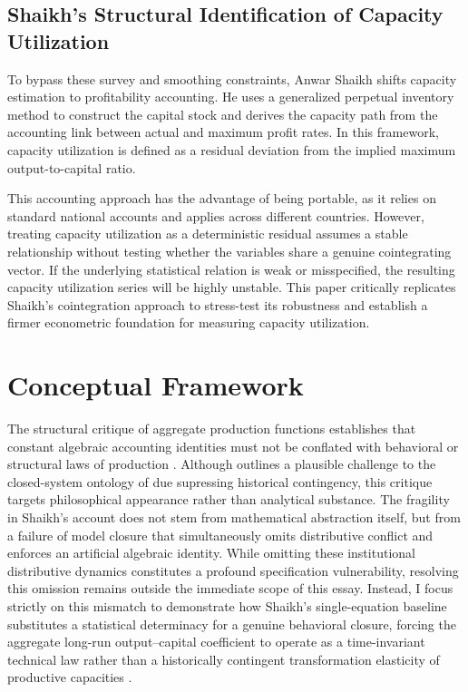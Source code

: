 \documentclass[11pt]{article}
\begin{document}
\subsection{Shaikh's Structural Identification of Capacity Utilization}
\label{subsec:shaikh_structural_measurement}

To bypass these survey and smoothing constraints, Anwar Shaikh \citep{Shaikh2016} shifts capacity estimation to profitability accounting. He uses a generalized perpetual inventory method to construct the capital stock and derives the capacity path from the accounting link between actual and maximum profit rates. In this framework, capacity utilization is defined as a residual deviation from the implied maximum output-to-capital ratio.

This accounting approach has the advantage of being portable, as it relies on standard national accounts and applies across different countries. However, treating capacity utilization as a deterministic residual assumes a stable relationship without testing whether the variables share a genuine cointegrating vector. If the underlying statistical relation is weak or misspecified, the resulting capacity utilization series will be highly unstable. This paper critically replicates Shaikh's cointegration approach to stress-test its robustness and establish a firmer econometric foundation for measuring capacity utilization.

\section{Conceptual Framework}
\label{sec:conceptual_framework}

The structural critique of aggregate production functions establishes that constant algebraic accounting identities must not be conflated with behavioral or structural laws of production \citep{Shaikh1974}. Although \citet{Patomaki2017} outlines a plausible challenge to the closed-system ontology of \citet{Shaikh2016} due supressing historical contingency, this critique targets philosophical appearance rather than analytical substance. The fragility in Shaikh's account does not stem from mathematical abstraction itself, but from a failure of model closure that simultaneously omits distributive conflict and enforces an artificial algebraic identity. While omitting these institutional distributive dynamics constitutes a profound specification vulnerability, resolving this omission remains outside the immediate scope of this essay. Instead, I focus strictly on this  mismatch to demonstrate how Shaikh's single-equation baseline substitutes a statistical determinacy for a genuine behavioral closure, forcing the aggregate long-run output--capital coefficient to operate as a time-invariant technical law rather than a historically contingent transformation elasticity of productive capacities \citep{Nikiforos2021closure}.
\end{document}

